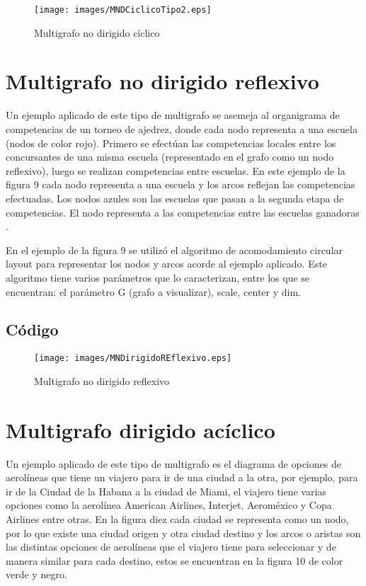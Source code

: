 \documentclass{article}
\begin{document}
\begin{figure}[H] 
\centering
\texttt{[image: images/MNDCiclicoTipo2.eps]}
\caption{Multigrafo no dirigido cíclico}
\end{figure}

\section{Multigrafo no dirigido reflexivo}

Un ejemplo aplicado de este tipo de multigrafo se asemeja al organigrama de competencias de un torneo de ajedrez, donde cada nodo representa a una escuela (nodos de color rojo). Primero se efectúan las competencias locales entre los concursantes de una misma escuela (representado en el grafo como un nodo reflexivo), luego se realizan competencias entre escuelas. En este ejemplo de la figura 9 cada nodo representa a una escuela y los arcos reflejan las competencias efectuadas. Los nodos azules son las escuelas que pasan a la segunda etapa de competencias. El nodo representa a las competencias entre las escuelas ganadoras \cite{ahuja}.

En el ejemplo de la figura 9 se utilizó el algoritmo de acomodamiento circular layout para representar los nodos y arcos acorde al ejemplo aplicado. Este algoritmo tiene varios parámetros que lo caracterizan, entre los que se encuentran: el parámetro G (grafo a visualizar), scale, center y dim.

\subsection{Código}


\begin{figure}[H] 
\centering
\texttt{[image: images/MNDirigidoREflexivo.eps]}
\caption{Multigrafo no dirigido reflexivo}
\end{figure}

\section{Multigrafo dirigido acíclico}

Un ejemplo aplicado de este tipo de multigrafo es el diagrama de opciones de aerolíneas que tiene un viajero para ir de una ciudad a la otra, por ejemplo, para ir de la Ciudad de la Habana a la ciudad de Miami, el viajero tiene varias opciones como la aerolínea American Airlines, Interjet, Aeroméxico y Copa Airlines entre otras. En la figura diez cada ciudad se representa como un nodo, por lo que existe una ciudad origen y otra ciudad destino y los arcos o aristas son las distintas opciones de aerolíneas que el viajero tiene para seleccionar y de manera similar para cada destino, estos se encuentran en la figura 10 de color verde y negro.
\end{document}

